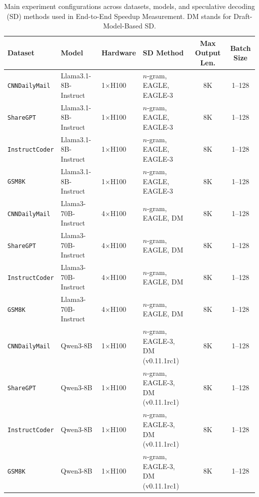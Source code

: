 \documentclass{article}
\begin{document}
\begin{table}[t!]
\centering
\caption{Main experiment configurations across datasets, models, and speculative decoding (SD) methods used in End-to-End Speedup Measurement. DM stands for Draft-Model-Based SD.}
\label{tab:exp-config}
\setlength{\tabcolsep}{2.5pt}
\renewcommand{\arraystretch}{1.1}
\begin{tabular}{l l l l c c}
\toprule
\textbf{Dataset} & \textbf{Model} & \textbf{Hardware} & \textbf{SD Method} & \textbf{Max Output Len.} & \textbf{Batch Size}\\
\midrule
\texttt{CNNDailyMail} & Llama3.1-8B-Instruct & 1$\times$H100 & $n$-gram, EAGLE, EAGLE-3  & 8K & 1–128 \\
\texttt{ShareGPT}     & Llama3.1-8B-Instruct & 1$\times$H100 & $n$-gram, EAGLE, EAGLE-3  & 8K & 1–128 \\
\texttt{InstructCoder}& Llama3.1-8B-Instruct & 1$\times$H100 & $n$-gram, EAGLE, EAGLE-3  & 8K & 1–128 \\
\texttt{GSM8K}        & Llama3.1-8B-Instruct & 1$\times$H100 & $n$-gram, EAGLE, EAGLE-3  & 8K & 1–128 \\
\midrule
\texttt{CNNDailyMail} & Llama3-70B-Instruct  & 4$\times$H100 & $n$-gram, EAGLE, DM       & 8K & 1–128 \\
\texttt{ShareGPT}     & Llama3-70B-Instruct  & 4$\times$H100 & $n$-gram, EAGLE, DM         & 8K & 1–128 \\
\texttt{InstructCoder}& Llama3-70B-Instruct  & 4$\times$H100 & $n$-gram, EAGLE, DM         & 8K & 1–128 \\
\texttt{GSM8K}        & Llama3-70B-Instruct  & 4$\times$H100 & $n$-gram, EAGLE, DM         & 8K & 1–128 \\
\midrule
\texttt{CNNDailyMail} & Qwen3-8B    & 1$\times$H100 & $n$-gram, EAGLE-3, DM (v0.11.1rc1)         & 8K  & 1–128 \\
\texttt{ShareGPT}     & Qwen3-8B    & 1$\times$H100 & $n$-gram, EAGLE-3, DM (v0.11.1rc1)       & 8K  & 1–128 \\
\texttt{InstructCoder}& Qwen3-8B    & 1$\times$H100 & $n$-gram, EAGLE-3, DM (v0.11.1rc1)     & 8K  & 1–128 \\
\texttt{GSM8K}        & Qwen3-8B    & 1$\times$H100 & $n$-gram, EAGLE-3, DM (v0.11.1rc1)     & 8K  & 1–128 \\
\midrule

\end{tabular}
\end{table}
\end{document}
